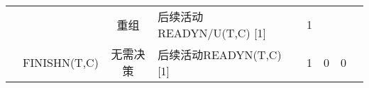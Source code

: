 \begin{table}[htbp]
\begin{tabular}{rrrrrrrr}
        \multicolumn{1}{c}{} &       & \multicolumn{1}{c}{重组} & \multicolumn{1}{l}{后续活动READYN/U(T,C) [1]} & \multicolumn{1}{c}{1} &       & \textit{} \\
        \multicolumn{1}{c}{} & FINISHN(T,C) & \multicolumn{1}{c}{无需决策} & \multicolumn{1}{l}{后续活动READYN(T,C) [1]} & \multicolumn{1}{c}{1} & \multicolumn{1}{c}{0} & \multicolumn{1}{c}{0} \\
            \bottomrule
        \end{tabular}%
        \label{tab:addlabel}%
    \end{table}%
    


